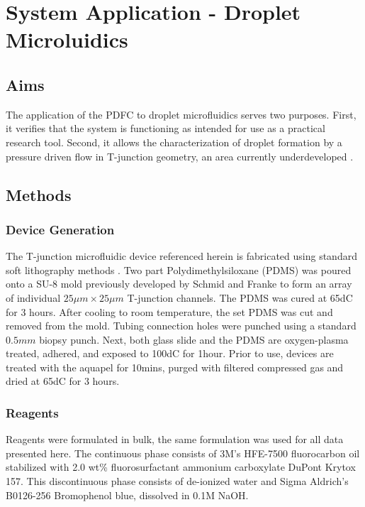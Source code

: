 \chapter{System Application - Droplet Microluidics}
\section{Aims}
The application of the PDFC to droplet microfluidics serves two purposes. First, it verifies that the system is functioning as intended for use as a practical research tool. Second, it allows the characterization of droplet formation by a pressure driven flow in T-junction geometry, an area currently underdeveloped \cite{Christopher2008}. 

\section{Methods}
\subsection{Device Generation}

The T-junction microfluidic device referenced herein is fabricated using standard soft lithography methods \cite{Stroock2002}. Two part Polydimethylsiloxane (PDMS) was poured onto a SU-8 mold previously developed by Schmid and Franke \cite{Schmid2014c} to form an array of individual $25 \mu m \times 25 \mu m$ T-junction channels. The PDMS was cured at 65dC for 3 hours. After cooling to room temperature, the set PDMS was cut and removed from the mold. Tubing connection holes were punched using a standard $0.5mm$ biopsy punch. Next, both glass slide and the PDMS are oxygen-plasma treated, adhered, and exposed to 100dC for 1hour. Prior to use, devices are treated with the aquapel for 10mins, purged with filtered compressed gas and dried at 65dC for 3 hours. 

\subsection{Reagents}

Reagents were formulated in bulk, the same formulation was used for all data presented here. The continuous phase consists of 3M's HFE-7500 fluorocarbon oil stabilized with 2.0 wt\% fluorosurfactant ammonium carboxylate DuPont Krytox 157. This discontinuous phase consists of de-ionized water and Sigma Aldrich's B0126-256 Bromophenol blue, dissolved in 0.1M NaOH.

